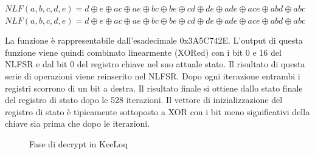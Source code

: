\begin{center}
  \(NLF(a, b, c, d, e) = d \oplus e \oplus ac \oplus ae \oplus bc \oplus be \oplus cd \oplus de \oplus ade \oplus ace \oplus abd \oplus abc\) \(NLF(a, b, c, d, e) = d \oplus e \oplus ac \oplus ae \oplus bc \oplus be \oplus cd \oplus de \oplus ade \oplus ace \oplus abd \oplus abc\) \cite{keeloqwiki,keeloqc,algebraic_slide,cryptoeprint}
\end{center}
La funzione è rappresentabile dall’esadecimale 0x3A5C742E. L’output di questa funzione viene quindi combinato linearmente (XORed) con i bit 0 e 16 del NLFSR e dal bit 0 del registro chiave nel suo attuale stato. Il risultato di questa serie di operazioni viene reinserito nel NLFSR. Dopo ogni iterazione entrambi i registri scorrono di un bit a destra. Il risultato finale si ottiene dallo stato finale del registro di stato dopo le 528 iterazioni. Il vettore di inizializzazione del registro di stato è tipicamente sottoposto a XOR con i bit meno significativi della chiave sia prima che dopo le iterazioni.\\

\begin{figure} %
  \centering
  \def\stackalignment{r} %
  {\scriptsize}
  \caption{Fase di decrypt in KeeLoq \cite{keeloqwiki}}
  \label{fig:keeloq_decrypt}
\end{figure}

